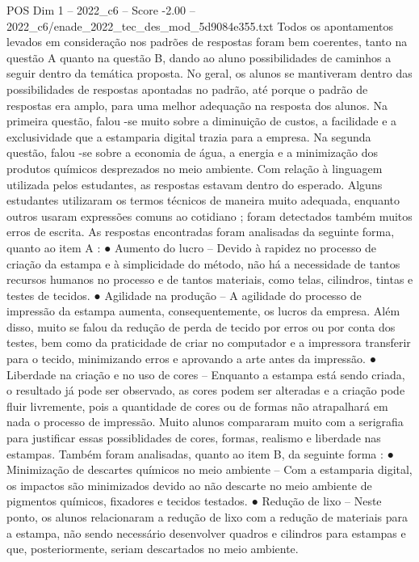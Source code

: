 \begin{textsample}{POS Dim 1 – 2022\_c6 – Score -2.00 – 2022\_c6/enade\_2022\_tec\_des\_mod\_5d9084e355.txt}
Todos os apontamentos levados em consideração nos padrões de respostas foram bem coerentes, tanto na questão A quanto na questão B, dando ao aluno possibilidades de caminhos a seguir dentro da temática proposta.
No geral, os alunos se mantiveram dentro das possibilidades de respostas apontadas no padrão, até porque o padrão de respostas era amplo, para uma melhor adequação na resposta dos alunos.
Na primeira questão, falou -se muito sobre a diminuição de custos, a facilidade e a exclusividade que a estamparia digital trazia para a empresa.
Na segunda questão, falou -se sobre a economia de água, a energia e a minimização dos produtos químicos desprezados no meio ambiente.
Com relação à linguagem utilizada pelos estudantes, as respostas estavam dentro do esperado.
Alguns estudantes utilizaram os termos técnicos de maneira muito adequada, enquanto outros usaram expressões comuns ao cotidiano ; foram detectados também muitos erros de escrita.
As respostas encontradas foram analisadas da seguinte forma, quanto ao item A : {\EmojiFont ●} Aumento do lucro – Devido à rapidez no processo de criação da estampa e à simplicidade do método, não há a necessidade de tantos recursos humanos no processo e de tantos materiais, como telas, cilindros, tintas e testes de tecidos. {\EmojiFont ●} Agilidade na produção – A agilidade do processo de impressão da estampa aumenta, consequentemente, os lucros da empresa.
Além disso, muito se falou da redução de perda de tecido por erros ou por conta dos testes, bem como da praticidade de criar no computador e a impressora transferir para o tecido, minimizando erros e aprovando a arte antes da impressão. {\EmojiFont ●} Liberdade na criação e no uso de cores – Enquanto a estampa está sendo criada, o resultado já pode ser observado, as cores podem ser alteradas e a criação pode fluir livremente, pois a quantidade de cores ou de formas não atrapalhará em nada o processo de impressão.
Muito alunos compararam muito com a serigrafia para justificar essas possiblidades de cores, formas, realismo e liberdade nas estampas.
Também foram analisadas, quanto ao item B, da seguinte forma : {\EmojiFont ●} Minimização de descartes químicos no meio ambiente – Com a estamparia digital, os impactos são minimizados devido ao não descarte no meio ambiente de pigmentos químicos, fixadores e tecidos testados. {\EmojiFont ●} Redução de lixo – Neste ponto, os alunos relacionaram a redução de lixo com a redução de materiais para a estampa, não sendo necessário desenvolver quadros e cilindros para estampas e que, posteriormente, seriam descartados no meio ambiente.

\end{textsample}
